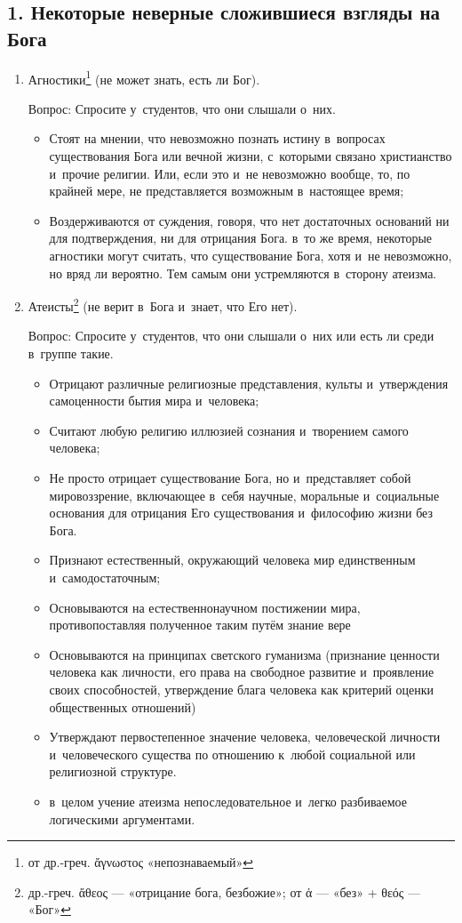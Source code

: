 \documentclass[a4paper,12pt]{article}
\begin{document}
\subsection{1. Некоторые неверные сложившиеся взгляды на Бога}
\begin{enumerate}
    \item Агностики\footnote{от др.-греч. ἄγνωστος «непознаваемый»} (не может знать, есть ли Бог). 
    
    Вопрос: Спросите у~студентов, что они слышали о~них.
    \begin{itemize}
        \item Стоят на мнении, что невозможно познать истину в~вопросах существования Бога или вечной жизни, с~которыми связано христианство и~прочие религии. Или, если это и~не невозможно вообще, то, по крайней мере, не представляется возможным в~настоящее время;
        \item Воздерживаются от суждения, говоря, что нет достаточных оснований ни для подтверждения, ни для отрицания Бога. в~то же время, некоторые агностики могут считать, что существование Бога, хотя и~не невозможно, но вряд ли вероятно. Тем самым они устремляются в~сторону атеизма.
    \end{itemize}

    \item Атеисты\footnote{др.-греч. ἄθεος — «отрицание бога, безбожие»; от ἀ — «без» + θεός — «Бог»} (не верит в~Бога и~знает, что Его нет).
    
    Вопрос: Спросите у~студентов, что они слышали о~них или есть ли среди в~группе такие.

    \begin{itemize}
        \item Отрицают различные религиозные представления, культы и~утверждения самоценности бытия мира и~человека;
        \item Считают любую религию иллюзией сознания и~творением самого человека;
        \item Не просто отрицает существование Бога, но и~представляет собой мировоззрение, включающее в~себя научные, моральные и~социальные основания для отрицания Его существования и~философию жизни без Бога.
        \item Признают естественный, окружающий человека мир единственным и~самодостаточным;
        \item Основываются на естественнонаучном постижении мира, противопоставляя полученное таким путём знание вере
        \item Основываются на принципах светского гуманизма (признание ценности человека как личности, его права на свободное развитие и~проявление своих способностей, утверждение блага человека как критерий оценки общественных отношений)
        \item Утверждают первостепенное значение человека, человеческой личности и~человеческого существа по отношению к~любой социальной или религиозной структуре.
        \item в~целом учение атеизма непоследовательное и~легко разбиваемое логическими аргументами.
    \end{itemize}


\end{enumerate}
\end{document}
